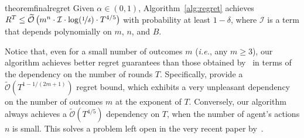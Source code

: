 %
%
\begin{restatable}{theorem}{finalregret}\label{thm:regret}
Given $\alpha \in (0,1)$, Algorithm~\ref{alg:regret} achieves $R^T  \le \widetilde{\mathcal{O}} \left(  m^n \cdot \mathcal{I} \cdot  \log (\nicefrac{1}{\delta}) \cdot 
T^{4/5} \right)$ with probability at least $1-\delta$, where $\mathcal{I}$ is a term that depends polynomially on $m$, $n$, and $B$.
%
\end{restatable}
%
Notice that, even for a small number of outcomes $m$ (\emph{i.e.}, any $m \geq 3$), our algorithm achieves better regret guarantees than those obtained by~\citet{zhu2022sample} in terms of the dependency on the number of rounds $T$.
%
%
Specifically, \citet{zhu2022sample} provide a $\widetilde{\mathcal{O}}(T^{1-1/(2m+1)})$ regret bound, which exhibits a very unpleasant dependency on the number of outcomes $m$ at the exponent of $T$.
%
Conversely, our algorithm always achieves a $\widetilde{\mathcal{O}}(T^{4/5})$ dependency on $T$, when the number of agent's actions $n$ is small.
%
This solves a problem left open in the very recent paper by~\citet{zhu2022sample}.
%
%
%


